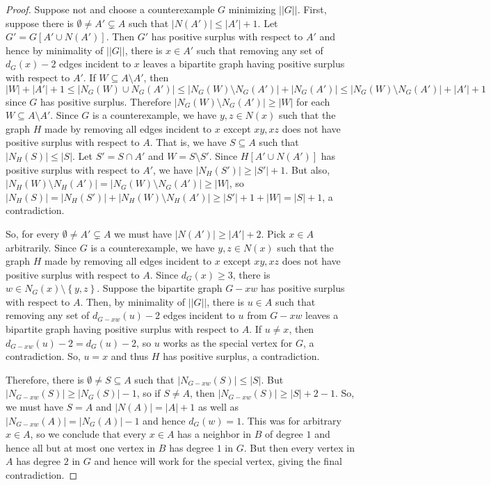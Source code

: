 \documentclass[12pt]{article}
\theoremstyle{plain}
\theoremstyle{definition}
\theoremstyle{remark}
\newcommand{\set}[1]{\left\{ #1 \right\}}
\begin{document}
\begin{proof}
Suppose not and choose a counterexample $G$ minimizing $||G||$.  First, suppose there is $\emptyset \ne A' \subsetneq A$ such that $|N(A')| \le |A'| + 1$.  Let $G' = G[A' \cup N(A')]$.  Then $G'$ has positive surplus with respect to $A'$ and hence by minimality of $||G||$, there is $x \in A'$ such that removing any set of $d_G(x) - 2$ edges incident to $x$ leaves a bipartite graph having positive surplus with respect to $A'$.  If $W \subseteq A \setminus A'$, then $|W| + |A'| + 1 \le |N_G(W) \cup N_G(A')| \le |N_G(W) \setminus N_G(A')| + |N_G(A')| \le |N_G(W) \setminus N_G(A')| + |A'| + 1$ since $G$ has positive surplus.  Therefore $|N_G(W) \setminus N_G(A')| \ge |W|$ for each $W \subseteq A \setminus A'$.  Since $G$ is a counterexample, we have $y,z \in N(x)$ such that the graph $H$ made by removing all edges incident to $x$ except $xy,xz$ does not have positive surplus with respect to $A$.  That is, we have $S \subseteq A$ such that $|N_H(S)| \le |S|$.  Let $S' = S \cap A'$ and $W = S \setminus S'$.  Since $H[A' \cup N(A')]$ has positive surplus with respect to $A'$, we have $|N_H(S')| \ge |S'| + 1$.  But also, $|N_H(W) \setminus N_H(A')| = |N_G(W) \setminus N_G(A')| \ge |W|$, so $|N_H(S)| = |N_H(S')| + |N_H(W) \setminus N_H(A')| \ge |S'| + 1 + |W| = |S| + 1$, a contradiction.

So, for every $\emptyset \ne A' \subsetneq A$ we must have $|N(A')| \ge |A'| + 2$.  Pick $x \in A$ arbitrarily. Since $G$ is a counterexample, we have $y,z \in N(x)$ such that the graph $H$ made by removing all edges incident to $x$ except $xy, xz$ does not have positive surplus with respect to $A$.  Since $d_G(x) \ge 3$, there is $w \in N_G(x) \setminus \set{y,z}$.  Suppose the bipartite graph $G - xw$ has positive surplus with respect to $A$.  Then, by minimality of $||G||$, there is $u \in A$ such that removing any set of $d_{G-xw}(u) - 2$ edges incident to $u$ from $G-xw$ leaves a bipartite graph having positive surplus with respect to $A$.  If $u \ne x$, then $d_{G-xw}(u) - 2 = d_G(u) - 2$, so $u$ works as the special vertex for $G$, a contradiction.  So, $u=x$ and thus $H$ has positive surplus, a contradiction.

Therefore, there is $\emptyset \ne S \subseteq A$ such that $|N_{G-xw}(S)| \le |S|$.  But $|N_{G-xw}(S)| \ge |N_G(S)| - 1$, so if $S \ne A$, then $|N_{G-xw}(S)| \ge |S| + 2 - 1$.  So, we must have $S=A$ and $|N(A)| = |A| + 1$ as well as $|N_{G-xw}(A)| = |N_G(A)| - 1$ and hence $d_G(w) = 1$.  This was for arbitrary $x \in A$, so we conclude that every $x \in A$ has a neighbor in $B$ of degree $1$ and hence all but at most one vertex in $B$ has degree $1$ in $G$.  But then every vertex in $A$ has degree $2$ in $G$ and hence will work for the special vertex, giving the final contradiction.
\end{proof}
\end{document}
